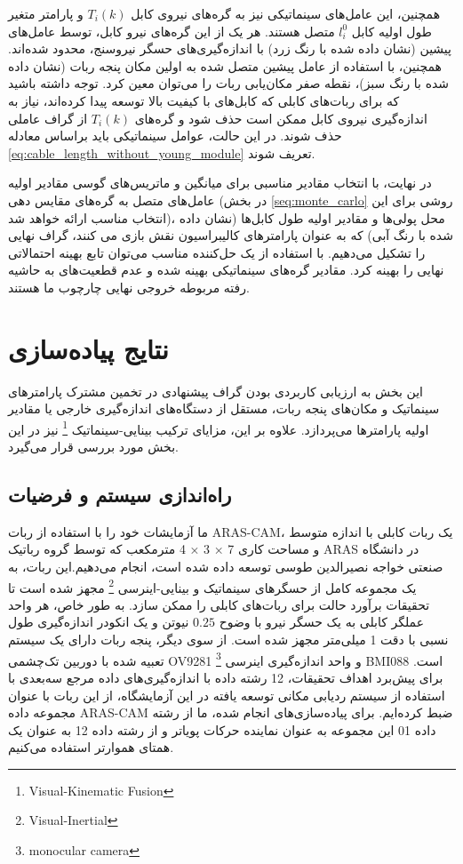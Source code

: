 همچنین، این عامل‌های سینماتیکی نیز به گره‌های نیروی کابل
$T_i(k)$
و پارامتر متغیر طول اولیه کابل
$l_{i}^0$
 متصل هستند. هر یک از این گره‌های نیرو کابل، توسط عامل‌های پیشین (نشان داده شده با رنگ زرد) با اندازه‌گیری‌های حسگر نیروسنج، محدود شده‌اند. همچنین، با استفاده از عامل پیشین متصل شده به اولین مکان پنجه ربات (نشان داده شده با رنگ سبز)، نقطه صفر مکان‌یابی ربات را می‌توان معین کرد. توجه داشته باشید که برای ربات‌های کابلی که کابل‌های با کیفیت بالا توسعه پیدا کرده‌اند، نیاز به اندازه‌گیری نیروی کابل ممکن است حذف شود و گره‌های
$T_i(k)$
از گراف عاملی حذف شوند. در این حالت، عوامل سینماتیکی باید براساس معادله
\ref{eq:cable_length_without_young_module}
تعریف شوند. 

در نهایت، با انتخاب مقادیر مناسبی برای میانگین و ماتریس‌های گوسی مقادیر اولیه عامل‌های متصل به گره‌های مقایس دهی (در بخش 
\ref{seq:monte_carlo}
روشی برای این انتخاب مناسب ارائه خواهد شد)، محل پولی‌ها و مقادیر اولیه طول کابل‌ها (نشان‌ داده شده با رنگ آبی) که به عنوان پارامترهای کالیبراسیون نقش بازی می کنند، گراف نهایی را تشکیل می‌دهیم. با استفاده از یک حل‌کننده مناسب می‌توان تابع بهینه‌ احتمالاتی نهایی را بهینه کرد. مقادیر گره‌های سینماتیکی بهینه شده و عدم قطعیت‌های به حاشیه رفته مربوطه خروجی نهایی چارچوب ما هستند.

\section{نتایج پیاده‌سازی}
این بخش به ارزیابی کاربردی بودن گراف پیشنهادی در تخمین مشترک پارامترهای سینماتیک و مکان‌های پنجه ربات، مستقل از دستگاه‌های اندازه‌گیری خارجی یا مقادیر اولیه پارامترها می‌پردازد. علاوه بر این، مزایای ترکیب بینایی-سینماتیک
\footnote{Visual-Kinematic Fusion}
 نیز در این بخش مورد بررسی قرار می‌گیرد.

\subsection{راه‌اندازی سیستم و فرضیات}
ما آزمایشات خود را با استفاده از ربات ARAS-CAM، یک ربات کابلی با اندازه متوسط و مساحت کاری 7 × 3 × 4 مترمکعب که توسط گروه رباتیک ARAS در دانشگاه صنعتی خواجه نصیرالدین طوسی توسعه داده شده است، انجام می‌دهیم.این ربات، به یک مجموعه کامل از حسگرهای سینماتیک و بینایی-اینرسی
\footnote{Visual-Inertial}
 مجهز شده است تا تحقیقات برآورد حالت برای ربات‌های کابلی را ممکن سازد. به طور خاص، هر واحد عملگر کابلی به یک حسگر نیرو با وضوح 
 $0.25$
  نیوتن و یک انکودر اندازه‌گیری طول نسبی با دقت 1 میلی‌متر مجهز شده است. از سوی دیگر، پنجه ربات دارای یک سیستم تعبیه شده با دوربین تک‌چشمی OV9281 
 \footnote{monocular camera}
 و واحد اندازه‌گیری اینرسی BMI088 است. برای پیش‌برد اهداف تحقیقات، 12 رشته داده با اندازه‌گیری‌های داده مرجع سه‌بعدی با استفاده از سیستم ردیابی مکانی توسعه یافته در این آزمایشگاه، از این ربات با عنوان مجموعه داده ARAS-CAM ضبط کرده‌ایم. برای پیاده‌سازی‌های انجام شده، ما از رشته داده 01 این مجموعه به عنوان نماینده حرکات پویاتر و از رشته داده 12 به عنوان یک همتای هموارتر استفاده می‌کنیم.

